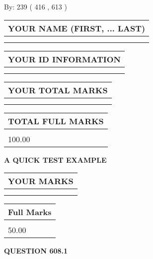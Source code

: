 \documentclass[12pt]{article}
\begin{document}
   
\hspace{1.0in} By: 
 239 ( 416 ,  613 )
   
   
   
   
\newpage 
\setcounter{page}{ 
   608001 } 
   
   
   
   
\noindent\begin{tabular}{|l|}
\hline
YOUR NAME (FIRST, ... LAST)  \\
\hline
 \\ 
 \\ 
\hline
\end{tabular}
\hspace{0.05in} \begin{tabular}{|l|}
\hline
 YOUR   ID   INFORMATION  \\
\hline
 \\ 
 \\ 
\hline
\end{tabular}
   
   
\vspace{0.2in}\noindent\begin{tabular}{|l|}
\hline
YOUR TOTAL MARKS  \\
\hline
 \\ 
 \\ 
\hline
\end{tabular}
\hspace{0.05in} \begin{tabular}{|l|}
\hline
TOTAL FULL MARKS  \\
\hline
 \\ 
100.00 \\
\hline
\end{tabular}
   
   
 \vspace{0.2in}
{\LARGE {\textbf{ A QUICK TEST EXAMPLE}}}
   
   
  
\vspace{0.2in}
  
\noindent\begin{tabular}{|l|}
\hline
 YOUR MARKS  \\
\hline
 \\ 
 \\ 
\hline
\end{tabular}
\hspace{0.05in} \begin{tabular}{|l|}
\hline
 Full Marks  \\
\hline
 \\ 
50.00 \\
\hline
\end{tabular}
{\textbf{\Large{QUESTION
608.1 
}}}
  
\end{document}
